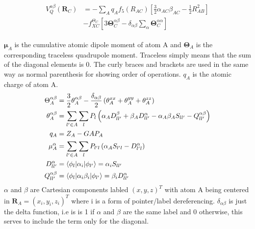 \begin{align}
    \begin{split}
        V_Q^{\alpha\beta}(\pmb{R}_C)
            &= -\sum_A q_Af_5(R_{AC})\left[          
                \frac{3}{2}\alpha_{AC}\beta_{AC}- \frac{1}{2}R_{AB}^2 %
                \right]\\
        &-f_{XC}^{\Theta_C}\left[3\pmb\Theta_C^{\alpha\beta}-\delta_{\alpha\beta}\sum_\alpha\pmb\Theta_C^{\alpha\alpha}\right]
    \end{split}
\end{align}

$\pmb{\mu}_A$ is the cumulative atomic dipole moment of atom A and $\pmb{\Theta}_A$ is the corresponding traceless quadrupole moment. Traceless simply means that the sum of the diagonal elements is 0. The curly braces and brackets are used in the same way as normal parenthesis for showing order of operations. $q_A$ is the atomic charge of atom A. 
\begin{align}
    \Theta_A^{\alpha\beta} &= \frac{3}{2} \theta_A^{\alpha\beta} - \frac{\delta_{\alpha\beta}}{2} \left( \theta_A^{xx} + \theta_A^{yy} + \theta_A^{zz} \right)\\
    \theta_A^{\alpha\beta} &= \sum_{l' \in A} \sum_{l} P_{l} \left( \alpha_A D_{ll'}^{\beta} + \beta_A D_{ll'}^{\alpha} - \alpha_A \beta_A S_{ll'} - Q_{ll'}^{\alpha\beta} \right)\\
    q_A &= Z_A - GAP_A\\
    \mu_A^{\alpha} &= \sum_{l' \in A} \sum_{l} P_{l'l} \left( \alpha_A S_{l'l} - D_{l'l}^{\alpha} \right)\\
    D_{ll'}^{\alpha} &= \braket{ \phi_{l} | \alpha_i | \phi_{l'}} = \alpha_i S_{ll'}\\
    Q_{ll'}^{\alpha\beta} &= \braket{ \phi_{l} | \alpha_i\beta_i | \phi_{l'}} = \beta_i D_{ll'}^\alpha
\end{align}
$\alpha$ and $\beta$ are Cartesian components labled $(x,y,z)^T$ with atom A being centered in $\pmb{R}_A = (x_i,y_i,z_i)^T$ where i is a form of pointer/label dereferencing. $\delta_{\alpha\beta}$ is just the delta function, i.e is is 1 if $\alpha$ and $\beta$ are the same label and 0 otherwise, this serves to include the term only for the diagonal. 

